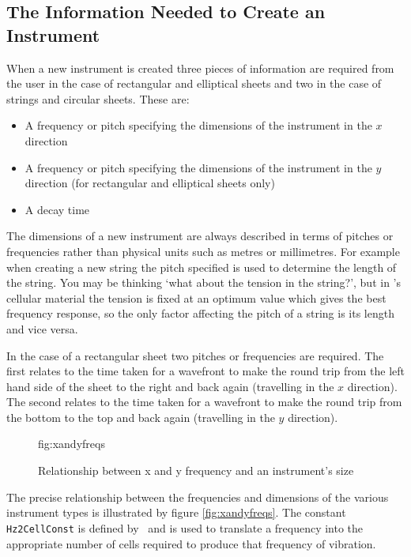 \subsection{The Information Needed to Create an Instrument}

When a new instrument is created three pieces of information are required
from the user in the case of rectangular and elliptical sheets and two in
the case of strings and circular sheets. These are:

\begin{itemize}
\item A frequency or pitch specifying the dimensions of the instrument
in the $x$ direction
\item A frequency or pitch specifying the dimensions of the instrument
in the $y$ direction (for rectangular and elliptical sheets only)
\item A decay time
\end{itemize}

The dimensions of a new instrument are always described in terms of
pitches or frequencies rather than physical units such as metres or
millimetres. For example when creating a new string the pitch specified
is used to determine the length of the string.
You may be thinking `what about the tension in the string?', but in
\tao's cellular material the tension is fixed at an optimum value which
gives the best frequency response, so the only factor affecting the
pitch of a string is its length and vice versa.

In the case of a rectangular sheet two pitches or frequencies are
required. The first relates to the time taken for a wavefront to make
the round trip from the left hand side of the sheet to the right and
back again (travelling in the $x$ direction). The second relates
to the time taken for a wavefront to make the round trip from the bottom
to the top and back again (travelling in the $y$ direction).

\begin{figure}[hbt]
  \begin{Label}{fig:xandyfreqs}
    \begin{center}
    \end{center}
    \caption{Relationship between x and y frequency and an instrument's size}
  \end{Label}
\end{figure}

The precise relationship between the frequencies and dimensions of the
various instrument types is illustrated by figure \ref{fig:xandyfreqs}.
The constant \verb|Hz2CellConst| is defined by \tao\ and is used to
translate a frequency into the appropriate number of cells required
to produce that frequency of vibration.

